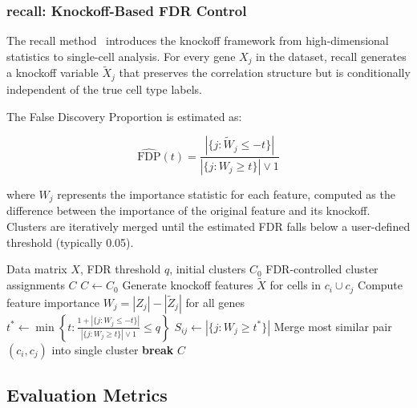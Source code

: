 \subsubsection{recall: Knockoff-Based FDR Control}

The recall method~\cite{denadel2024recall} introduces the knockoff framework from high-dimensional statistics to single-cell analysis. For every gene $X_j$ in the dataset, recall generates a knockoff variable $\tilde{X}_j$ that preserves the correlation structure but is conditionally independent of the true cell type labels.

The False Discovery Proportion is estimated as:

\begin{equation}
    \widehat{\text{FDP}}(t) = \frac{|\{j: \tilde{W}_j \leq -t\}|}{|\{j: W_j \geq t\}| \vee 1}
    \label{eq:fdp}
\end{equation}

where $W_j$ represents the importance statistic for each feature, computed as the difference between the importance of the original feature and its knockoff. Clusters are iteratively merged until the estimated FDR falls below a user-defined threshold (typically 0.05).

\begin{algorithm}[htbp]
\caption{recall: Knockoff-Based Cluster Calibration}
\label{alg:recall}
\begin{algorithmic}[1]
\Require Data matrix $X$, FDR threshold $q$, initial clusters $C_0$
\Ensure FDR-controlled cluster assignments $C$
\State $C \gets C_0$ 
        \State Generate knockoff features $\tilde{X}$ for cells in $c_i \cup c_j$
        \State Compute feature importance $W_j = |Z_j| - |\tilde{Z}_j|$ for all genes
        \State $t^* \gets \min\left\{t : \frac{1 + |\{j: W_j \leq -t\}|}{|\{j: W_j \geq t\}| \vee 1} \leq q\right\}$
        \State $S_{ij} \gets |\{j : W_j \geq t^*\}|$ 
    \EndFor
        \State Merge most similar pair $(c_i, c_j)$ into single cluster
    \Else
        \State \textbf{break} 
    \EndIf
\EndWhile
\State \Return $C$
\end{algorithmic}
\end{algorithm}

\subsection{Evaluation Metrics}

